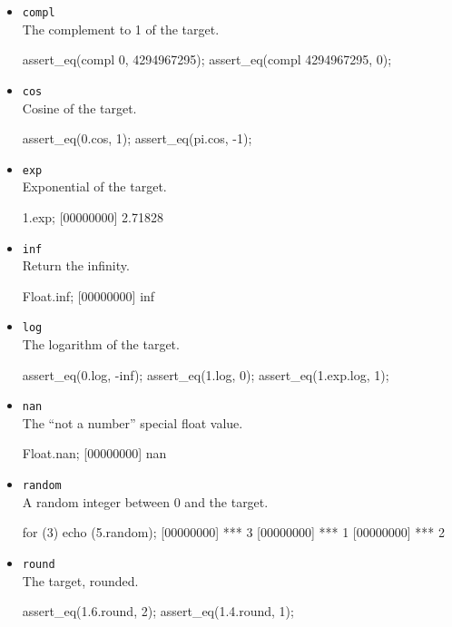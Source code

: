 \begin{itemize}
\item \lstinline|compl|\\
  The complement to 1 of the target.
\begin{urbiscript}[firstnumber=last]
assert_eq(compl 0, 4294967295);
assert_eq(compl 4294967295, 0);
\end{urbiscript}

\item \lstinline|cos|\\
  Cosine of the target.
\begin{urbiscript}[firstnumber=last]
assert_eq(0.cos, 1);
assert_eq(pi.cos, -1);
\end{urbiscript}

\item \lstinline|exp|\\
  Exponential of the target.
\begin{urbiscript}[firstnumber=last]
1.exp;
[00000000] 2.71828
\end{urbiscript}

\item \lstinline|inf|\\
  Return the infinity.
\begin{urbiscript}[firstnumber=last]
Float.inf;
[00000000] inf
\end{urbiscript}

\item \lstinline|log|\\
  The logarithm of the target.
\begin{urbiscript}[firstnumber=last]
assert_eq(0.log, -inf);
assert_eq(1.log, 0);
assert_eq(1.exp.log, 1);
\end{urbiscript}

\item \lstinline|nan|\\
  The ``not a number'' special float value.
\begin{urbiscript}[firstnumber=last]
Float.nan;
[00000000] nan
\end{urbiscript}

\item \lstinline|random|\\
  A random integer between 0 and the target.
\begin{urbiscript}[firstnumber=last]
for (3)
  echo (5.random);
[00000000] *** 3
[00000000] *** 1
[00000000] *** 2
\end{urbiscript}

\item \lstinline|round|\\
  The target, rounded.
\begin{urbiscript}[firstnumber=last]
assert_eq(1.6.round, 2);
assert_eq(1.4.round, 1);
\end{urbiscript}


\end{itemize}
